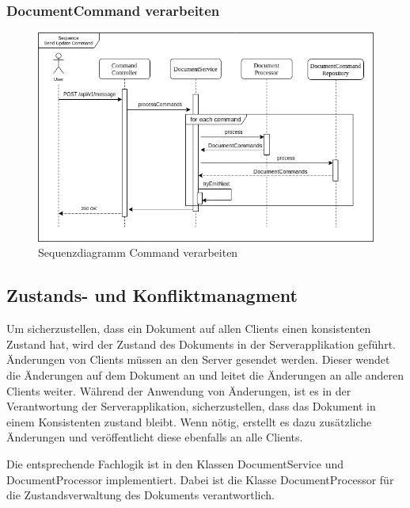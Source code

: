 \clearpage

\subsubsection{DocumentCommand verarbeiten}

\begin{figure}[h]
    \centering
    \begin{minipage}[b]{1\textwidth}
        \includegraphics[width=\textwidth]{graphics/seq_send_command.drawio}
        \caption{Sequenzdiagramm Command verarbeiten}
    \end{minipage}
\end{figure}

\clearpage

\subsection{Zustands- und Konfliktmanagment}

Um sicherzustellen, dass ein Dokument auf allen Clients einen konsistenten Zustand hat, wird der Zustand des Dokuments in der Serverapplikation geführt.
Änderungen von Clients müssen an den Server gesendet werden.
Dieser wendet die Änderungen auf dem Dokument an und leitet die Änderungen an alle anderen Clients weiter.
Während der Anwendung von Änderungen, ist es in der Verantwortung der Serverapplikation, sicherzustellen, dass das Dokument in einem Konsistenten zustand bleibt.
Wenn nötig, erstellt es dazu zusätzliche Änderungen und veröffentlicht diese ebenfalls an alle Clients.

Die entsprechende Fachlogik ist in den Klassen DocumentService und DocumentProcessor implementiert.
Dabei ist die Klasse DocumentProcessor für die Zustandsverwaltung des Dokuments verantwortlich.


